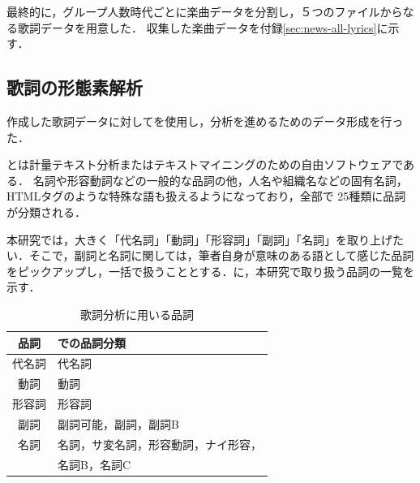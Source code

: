 %
%
%

最終的に，グループ人数時代ごとに楽曲データを分割し，５つのファイルからなる歌詞データを用意した．
収集した楽曲データを付録\ref{sec:news-all-lyrics}に示す．




\subsection{歌詞の形態素解析}
作成した歌詞データに対して\khcoder\cite{KHcoder}を使用し，分析を進めるためのデータ形成を行った．

\khcoder とは計量テキスト分析またはテキストマイニングのための自由ソフトウェアである．
%
名詞や形容動詞などの一般的な品詞の他，人名や組織名などの固有名詞，HTMLタグのような特殊な語も扱えるようになっており，全部で
25種類に品詞が分類される．

本研究では，大きく「代名詞」「動詞」「形容詞」「副詞」「名詞」を取り上げたい．そこで，副詞と名詞に関しては，筆者自身が意味のある語として感じた品詞をピックアップし，一括で扱うこととする．に，本研究で取り扱う品詞の一覧を示す．

\begin{table}[tb]
	\centering
	\caption{歌詞分析に用いる品詞}
	\label{tab:hinshi}
	\begin{tabular}{c|l}
		\hline
		品詞  & \khcoder での品詞分類    \\
		\hline
		代名詞 & 代名詞                \\
		動詞  & 動詞                 \\
		形容詞 & 形容詞                \\
		副詞  & 副詞可能，副詞，副詞B        \\
		名詞  & 名詞，サ変名詞，形容動詞，ナイ形容， \\
		    & 名詞B，名詞C            \\
		\hline

	\end{tabular}
\end{table}


